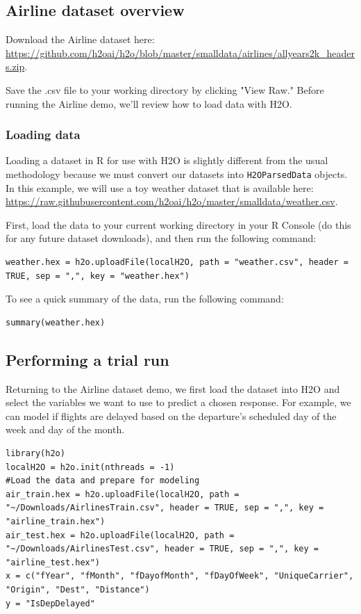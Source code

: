 \documentclass[11pt]{article}
\begin{document}
\subsection{Airline dataset overview} 

Download the Airline dataset here: {\url{https://github.com/h2oai/h2o/blob/master/smalldata/airlines/allyears2k_headers.zip}}.

Save the .csv file to your working directory by clicking  "View Raw."  Before running the Airline demo, we'll review how to load data with H2O. 

\subsubsection{Loading data} \label{2.5}

Loading a dataset in R for use with H2O is slightly different from the usual methodology because we must convert our datasets into \texttt{H2OParsedData} objects. In this example, we will use a toy weather dataset that is available here: {\url{https://raw.githubusercontent.com/h2oai/h2o/master/smalldata/weather.csv}}. 

First, load the data to your current working directory in your R Console (do this for any future dataset downloads), and then run the following command:
\begin{lstlisting}[style=R]
weather.hex = h2o.uploadFile(localH2O, path = "weather.csv", header = TRUE, sep = ",", key = "weather.hex")
\end{lstlisting}
\bigskip

To see a quick summary of the data, run the following command:
\begin{lstlisting}[style=R]
summary(weather.hex)
\end{lstlisting}

\subsection{Performing a trial run} \label{3.2}
Returning to the Airline dataset demo, we first load the dataset into H2O and select the variables we want to use to predict a chosen response. For example, we can model if flights are delayed based on the departure's scheduled day of the week and day of the month.

\begin{lstlisting}[style=R]
library(h2o)
localH2O = h2o.init(nthreads = -1)
#Load the data and prepare for modeling
air_train.hex = h2o.uploadFile(localH2O, path = "~/Downloads/AirlinesTrain.csv", header = TRUE, sep = ",", key = "airline_train.hex")
air_test.hex = h2o.uploadFile(localH2O, path = "~/Downloads/AirlinesTest.csv", header = TRUE, sep = ",", key = "airline_test.hex")
x = c("fYear", "fMonth", "fDayofMonth", "fDayOfWeek", "UniqueCarrier", "Origin", "Dest", "Distance")
y = "IsDepDelayed"
\end{lstlisting}
\end{document}
